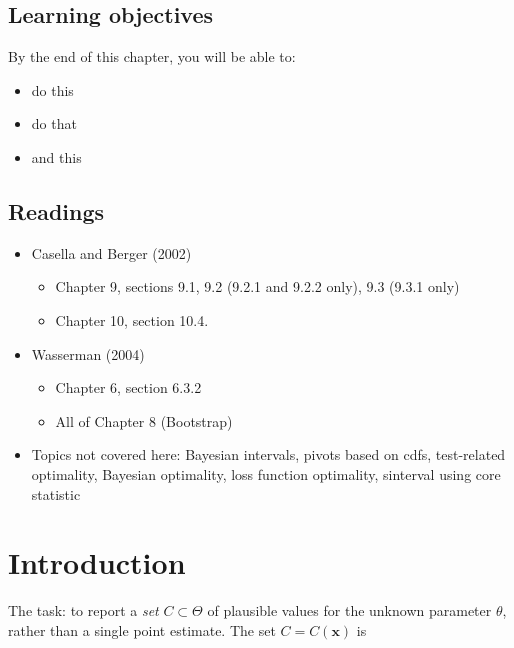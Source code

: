 \documentclass[
]{book}
\providecommand{\tightlist}{%
  \setlength{\itemsep}{0pt}\setlength{\parskip}{0pt}}
\newcommand{\bx}{{\boldsymbol x}}
\theoremstyle{definition}
\theoremstyle{definition}
\theoremstyle{definition}
\theoremstyle{definition}
\theoremstyle{remark}
\begin{document}
\hypertarget{learning-objectives-5}{%
\subsection*{Learning objectives}\label{learning-objectives-5}}

By the end of this chapter, you will be able to:

\begin{itemize}
\tightlist
\item
  do this
\item
  do that
\item
  and this
\end{itemize}

\hypertarget{readings-5}{%
\subsection*{Readings}\label{readings-5}}

\begin{itemize}
\tightlist
\item
  Casella and Berger (2002)

  \begin{itemize}
  \tightlist
  \item
    Chapter 9, sections 9.1, 9.2 (9.2.1 and 9.2.2 only), 9.3 (9.3.1 only)
  \item
    Chapter 10, section 10.4.
  \end{itemize}
\item
  Wasserman (2004)

  \begin{itemize}
  \tightlist
  \item
    Chapter 6, section 6.3.2
  \item
    All of Chapter 8 (Bootstrap)
  \end{itemize}
\item
  Topics not covered here: Bayesian intervals, pivots based on cdfs, test-related optimality, Bayesian optimality, loss function optimality, sinterval using core statistic
\end{itemize}

\hypertarget{introduction-3}{%
\section{Introduction}\label{introduction-3}}

The task: to report a \emph{set} \(C\subset \Theta\) of plausible values for the unknown parameter \(\theta\), rather than a single point estimate.
The set \(C=C(\bx)\) is
\end{document}

